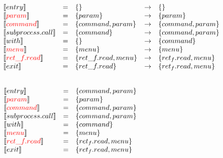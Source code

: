 \begin{frame}
  \[
\begin{array}{lclcl}
  \constraint{entry} & = & \{\}& \rightarrow & \{\} \\
  \assignconstraint{param} & = & \{param\}& \rightarrow & \{param\}\\ 
  \assignconstraint{command} & = & \{command , param \}& \rightarrow & \{command, param\}\\
  \constraint{subprocess.call} & = & \{command\}& \rightarrow & \{command, param\}\\
  \constraint{with} & = & \{\}& \rightarrow & \{command\}\\
  \assignconstraint{menu} & = & \{menu\} & \rightarrow & \{menu\}\\
  \assignconstraint{ret\_f.read} & = & \{ret\_f.read, menu\}& \rightarrow & \{ret_f.read, menu\}\\
  \constraint{exit} & = & \{ret\_f.read\}& \rightarrow & \{ret_f.read, menu\}\\
  && && \phantom{\{command, param\}}
\end{array}
\]
\end{frame}

\begin{frame}
  \[
\begin{array}{lclcl}
  \constraint{entry} & = & \{command, param\} & \phantom{\rightarrow} & \phantom{\{command, param\}}\\
  \assignconstraint{param} & = & \{param\} \\ 
  \assignconstraint{command} & = & \{command, param\}\\
  \constraint{subprocess.call} & = & \{command, param\}\\
  \constraint{with} & = & \{command\} \\
  \assignconstraint{menu} & = & \{menu\}\\
  \assignconstraint{ret\_f.read} & = & \{ret_f.read, menu\}\\
  \constraint{exit} & = & \{ret_f.read, menu\}\\
  &&  && \phantom{\{command, param\}}
\end{array}
\]
\end{frame}

